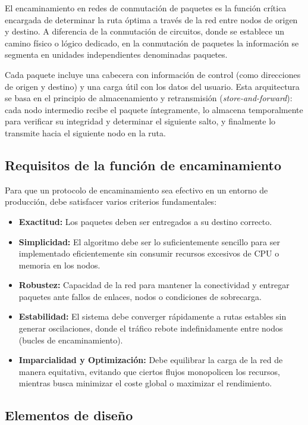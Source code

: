 El encaminamiento en redes de conmutación de paquetes es la función crítica encargada de determinar la ruta óptima a través de la red entre nodos de origen y destino. A diferencia de la conmutación de circuitos, donde se establece un camino físico o lógico dedicado, en la conmutación de paquetes la información se segmenta en unidades independientes denominadas paquetes.

Cada paquete incluye una cabecera con información de control (como direcciones de origen y destino) y una carga útil con los datos del usuario. Esta arquitectura se basa en el principio de almacenamiento y retransmisión (\textit{store-and-forward}): cada nodo intermedio recibe el paquete íntegramente, lo almacena temporalmente para verificar su integridad y determinar el siguiente salto, y finalmente lo transmite hacia el siguiente nodo en la ruta.

\subsection{Requisitos de la función de encaminamiento}

Para que un protocolo de encaminamiento sea efectivo en un entorno de producción, debe satisfacer varios criterios fundamentales:

\begin{itemize}
    \item \textbf{Exactitud:} Los paquetes deben ser entregados a su destino correcto.
    \item \textbf{Simplicidad:} El algoritmo debe ser lo suficientemente sencillo para ser implementado eficientemente sin consumir recursos excesivos de CPU o memoria en los nodos.
    \item \textbf{Robustez:} Capacidad de la red para mantener la conectividad y entregar paquetes ante fallos de enlaces, nodos o condiciones de sobrecarga.
    \item \textbf{Estabilidad:} El sistema debe converger rápidamente a rutas estables sin generar oscilaciones, donde el tráfico rebote indefinidamente entre nodos (bucles de encaminamiento).
    \item \textbf{Imparcialidad y Optimización:} Debe equilibrar la carga de la red de manera equitativa, evitando que ciertos flujos monopolicen los recursos, mientras busca minimizar el coste global o maximizar el rendimiento.
\end{itemize}

\subsection{Elementos de diseño}

